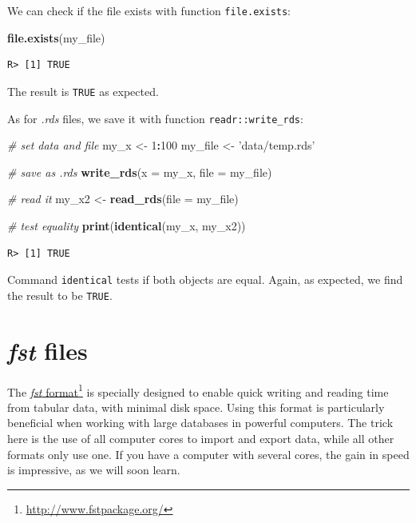 \documentclass[
  12pt,
]{book}
\newenvironment{Shaded}{\begin{snugshade}}{\end{snugshade}}
\newcommand{\CommentTok}[1]{\textcolor[rgb]{0.37,0.37,0.37}{\textit{#1}}}
\newcommand{\DataTypeTok}[1]{\textcolor[rgb]{0.27,0.27,0.27}{#1}}
\newcommand{\DecValTok}[1]{\textcolor[rgb]{0.06,0.06,0.06}{#1}}
\newcommand{\KeywordTok}[1]{\textcolor[rgb]{0.27,0.27,0.27}{\textbf{#1}}}
\newcommand{\NormalTok}[1]{#1}
\newcommand{\OperatorTok}[1]{\textcolor[rgb]{0.43,0.43,0.43}{\textbf{#1}}}
\newcommand{\StringTok}[1]{\textcolor[rgb]{0.5,0.5,0.5}{#1}}
\begin{document}
We can check if the file exists with function \texttt{file.exists}:

\begin{Shaded}
\begin{Highlighting}[]
\KeywordTok{file.exists}\NormalTok{(my_file)}
\end{Highlighting}
\end{Shaded}

\begin{verbatim}
R> [1] TRUE
\end{verbatim}

The result is \texttt{TRUE} as expected.

As for \emph{.rds} files, we save it with function \texttt{readr::write\_rds}:

\begin{Shaded}
\begin{Highlighting}[]
\CommentTok{# set data and file}
\NormalTok{my_x <-}\StringTok{ }\DecValTok{1}\OperatorTok{:}\DecValTok{100}
\NormalTok{my_file <-}\StringTok{ 'data/temp.rds'}

\CommentTok{# save as .rds}
\KeywordTok{write_rds}\NormalTok{(}\DataTypeTok{x =}\NormalTok{ my_x,}
          \DataTypeTok{file =}\NormalTok{ my_file)}

\CommentTok{# read it}
\NormalTok{my_x2 <-}\StringTok{ }\KeywordTok{read_rds}\NormalTok{(}\DataTypeTok{file =}\NormalTok{ my_file)}

\CommentTok{# test equality}
\KeywordTok{print}\NormalTok{(}\KeywordTok{identical}\NormalTok{(my_x, my_x2))}
\end{Highlighting}
\end{Shaded}

\begin{verbatim}
R> [1] TRUE
\end{verbatim}

Command \texttt{identical} tests if both objects are equal. Again, as expected, we find the result to be \texttt{TRUE}.

\hypertarget{fst-files}{%
\section{\texorpdfstring{\emph{fst} files}{fst files}}\label{fst-files}}

The \href{http://www.fstpackage.org/}{\emph{fst} format}\footnote{\url{http://www.fstpackage.org/}} is specially designed to enable quick writing and reading time from tabular data, with minimal disk space. Using this format is particularly beneficial when working with large databases in powerful computers. The trick here is the use of all computer cores to import and export data, while all other formats only use one. If you have a computer with several cores, the gain in speed is impressive, as we will soon learn. 
\end{document}
